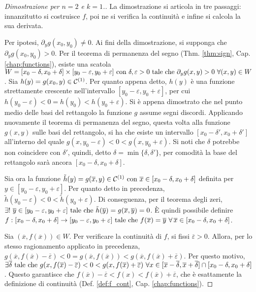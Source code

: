 \begin{proof}
    [Dimostrazione per $n=2$ e $k=1$.]
    La dimostrazione si articola in tre passaggi: innanzitutto si costruisce $f$, poi ne si verifica la continuità e infine si calcola la sua derivata.


    Per ipotesi, $\partial_yg(x_0,y_0) \neq 0$. Ai fini della dimostrazione, si supponga che $\partial_yg(x_0,y_0) > 0$. Per il teorema di permanenza del segno (Thm. \ref{thm:sign}, Cap. \ref{chap:functions}), esiste una scatola $W=[x_0-\delta,x_0+\delta]\times[y_0-\varepsilon,y_0+\varepsilon]\text{ con } \delta,\varepsilon>0 \text{ tale che } \partial_yg(x,y)>0\ \forall (x,y)\in W$. Sia $h(y)=g(x_0,y)\in\mathcal{C}^{(1)}$. Per quanto appena detto, $h(y)$ è una funzione strettamente crescente nell'intervallo $[y_0-\varepsilon, y_0+\varepsilon]$, per cui $h(y_0-\varepsilon)<0=h(y_0)<h(y_0+\varepsilon)$. Si è appena dimostrato che nel punto medio delle basi del rettangolo la funzione $g$ assume segni discordi. Applicando nuovamente il teorema di permanenza del segno, questa volta alla funzione $g(x,y)$ sulle basi del rettangolo, si ha che esiste un intervallo $[x_0-\delta ', x_0+\delta ']$ all'interno del quale $g(x,y_0-\varepsilon)<0<g(x,y_0+\varepsilon)$. Si noti che $\delta$ potrebbe non coincidere con $\delta '$, quindi, detto $\delta=\min\{\delta,\delta '\}$, per comodità la base del rettangolo sarà ancora $[x_0-\delta,x_0+\delta]$.
    

    Sia ora la funzione $\tilde{h}(y)=g(\overline{x},y) \in \mathcal{C}^{(1)} \text{ con } \overline{x} \in [x_0-\delta,x_0+\delta]$ definita per $y \in [y_0-\varepsilon,y_0+\varepsilon]$. Per quanto detto in precedenza, $\tilde{h}(y_0-\varepsilon)<0<\tilde{h}(y_0+\varepsilon)$. Di conseguenza, per il teorema degli zeri, $\exists!\ \overline{y} \in [y_0-\varepsilon,y_0+\varepsilon] \text{ tale che } \tilde{h}(\overline{y})=g(\overline{x},\overline{y})=0$. È quindi possibile definire $f:[x_0-\delta,x_0+\delta]\to[y_0-\varepsilon,y_0+\varepsilon] \text{ tale che } f(\overline{x})=\overline{y} \ \forall\, \overline{x} \in [x_0-\delta,x_0+\delta]$.


    Sia $(\overline{x},f(\overline{x}))\in W$. Per verificare la continuità di $f$, si fissi $\overline{\varepsilon}>0$. Allora, per lo stesso ragionamento applicato in precedenza, $g(\overline{x},f(\overline{x})-\overline{\varepsilon})<0=g(\overline{x},f(\overline{x}))<g(\overline{x}, f(\overline{x})+\overline{\varepsilon})$. Per questo motivo, $\exists \overline{\delta} \text{ tale che } g(x,f(\overline{x})-\overline{\varepsilon}) < 0 < g(x,f(\overline{x})+\overline{\varepsilon}) \ \forall x \in [\overline{x}-\overline{\delta},\overline{x}+\overline{\delta}]\cap[x_0-\delta,x_0+\delta]$. Questo garantisce che $f(\overline{x})-\overline{\varepsilon} < f(x) < f(\overline{x})+\overline{\varepsilon}$, che è esattamente la definizione di continuità (Def. \ref{def:f_cont}, Cap. \ref{chap:functions}).



\end{proof}
